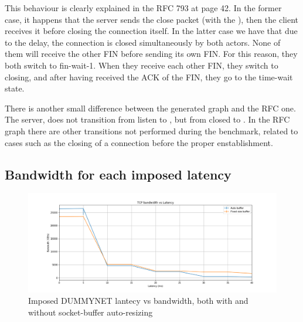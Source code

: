 \documentclass[a4paper,10pt]{article}
\begin{document}
This behaviour is clearly explained in the RFC 793\cite{postel_transmission_nodate} at page 42. In the former case, it happens that the server sends the close packet (with the ), then the client receives it before closing the connection itself.
In the latter case we have that due to the delay, the connection is closed simultaneously by both actors. None of them will receive the other FIN before sending its own FIN. For this reason, they both switch to fin-wait-1. When they receive each other FIN, they switch to closing, and after having received the ACK of the FIN, they go to the time-wait state.

There is another small difference between the generated graph and the RFC one. The server, does not transition from listen to , but from closed to . In the RFC graph there are other transitions not performed during the benchmark, related to cases such as the closing of a connection before the proper enstablishment.



\subsection{Bandwidth for each imposed latency}

\begin{figure}[h]
\centering
\includegraphics[width=\textwidth]{images/tcp_bandwidth.png}
  \caption{Imposed DUMMYNET lantecy vs bandwidth, both with and without socket-buffer auto-resizing}
   \label{fig:bandwidth}
\end{figure}
\end{document}
